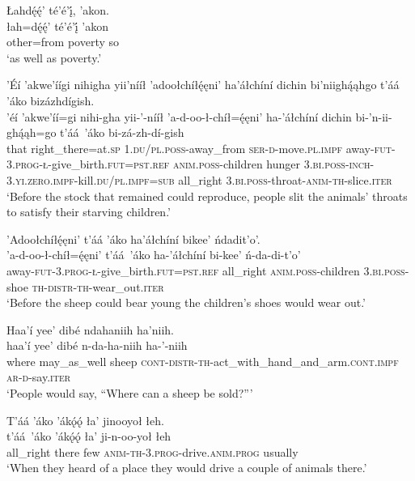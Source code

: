 \ea\label{ex:text7-15-7}
Łahdę́ę́’ té’é’į́, ’akon.\\
\gll łah=dę́ę́’	té’é’į́	’akon\\
     other=from	poverty	so\\
\glt `as well as poverty.'
\z

\ea\label{ex:text7-15-8}
’Éí ’akwe’íígi nihigha yii’nííł ’adoołchíłę́ęni’ ha’áłchíní dichin bi’niighą́ąhgo t’áá ’áko bizázhdígish.\\
\gll ’éí	’akwe’íí=gi	nihi-gha	yii-’-nííł	’a-d-oo-ł-chíł=ę́ęni’	ha-’áłchíní	dichin	bi-’n-ii-ghą́ąh=go	t’áá~{’áko}	bi-zá-zh-dí-gish\\
     that	right\_there=at.\textsc{sp}	1.\textsc{du}/\textsc{pl}.\textsc{poss}-away\_from	\textsc{ser}-\textsc{d}-move.\textsc{pl}.\textsc{impf}	away-\textsc{fut}-3.\textsc{prog}-\textsc{ł}-give\_birth.\textsc{fut}=\textsc{pst}.\textsc{ref}	\textsc{anim}.\textsc{poss}-children	hunger	3.\textsc{bi}.\textsc{poss}-\textsc{inch}-3.\textsc{yi}.\textsc{zero}.\textsc{impf}-kill.\textsc{du}/\textsc{pl}.\textsc{impf}=\textsc{sub}	all\_right	3.\textsc{bi}.\textsc{poss}-throat-\textsc{anim}-\textsc{th}-slice.\textsc{iter}\\
\glt `Before the stock that remained could reproduce, people slit the animals' throats to satisfy their starving children.'
\z

\ea\label{ex:text7-15-9}
’Adoołchíłę́ęni’ t’áá ’áko ha’áłchíní bikee’ ńdadit’o’.\\
\gll ’a-d-oo-ł-chíł=ę́ęni’	t’áá~{’áko}	ha-’áłchíní	bi-kee’	ń-da-di-t’o’\\
     away-\textsc{fut}-3.\textsc{prog}-\textsc{ł}-give\_birth.\textsc{fut}=\textsc{pst}.\textsc{ref}	all\_right	\textsc{anim}.\textsc{poss}-children	3.\textsc{bi}.\textsc{poss}-shoe	\textsc{th}-\textsc{distr}-\textsc{th}-wear\_out.\textsc{iter}\\
\glt `Before the sheep could bear young the children's shoes would wear out.'
\z

\ea\label{ex:text7-15-10}
Haa’í yee’ dibé ndahaniih ha’niih.\\
\gll haa’í	yee’	dibé	n-da-ha-niih	ha-’-niih\\
     where	may\_as\_well	sheep	\textsc{cont}-\textsc{distr}-\textsc{th}-act\_with\_hand\_and\_arm.\textsc{cont}.\textsc{impf}	\textsc{ar}-\textsc{d}-say.\textsc{iter}\\
\glt `People would say, ``Where can a sheep be sold?'''
\z

\ea\label{ex:text7-15-11}
T’áá ’áko ’ákǫ́ǫ́ ła’ jinooyoł łeh.\\
\gll t’áá~{’áko}	’ákǫ́ǫ́	ła’	ji-n-oo-yoł	łeh\\
     all\_right	there	few	\textsc{anim}-\textsc{th}-3.\textsc{prog}-drive.\textsc{anim}.\textsc{prog}	usually\\
\glt `When they heard of a place they would drive a couple of animals there.'
\z

